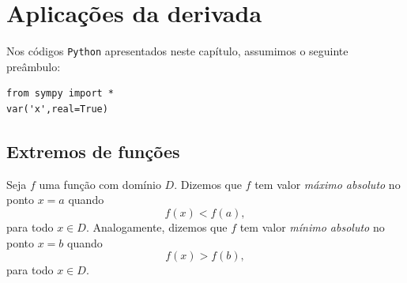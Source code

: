 
\chapter{Aplicações da derivada}\label{cap_apderiv}
\thispagestyle{fancy}

\ifispython
\begin{obs}
  Nos códigos \verb+Python+ apresentados neste capítulo, assumimos o seguinte preâmbulo:
\begin{verbatim}
from sympy import *
var('x',real=True)
\end{verbatim}
\end{obs}
\fi

\section{Extremos de funções}\label{cap_apderiv_sec_extfun}

Seja $f$ uma função com domínio $D$. Dizemos que $f$ tem valor \emph{máximo absoluto} no ponto $x=a$ quando
\begin{equation}
  f(x) < f(a),
\end{equation}
para todo $x\in D$. Analogamente, dizemos que $f$ tem valor \emph{mínimo absoluto} no ponto $x=b$ quando
\begin{equation}
  f(x) > f(b),
\end{equation}
para todo $x\in D$.


